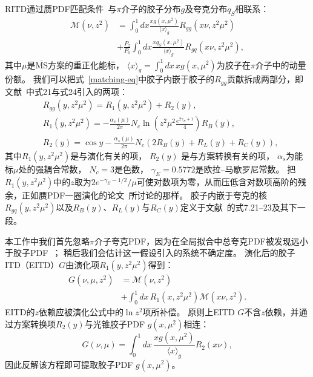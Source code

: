 RITD通过赝PDF匹配条件~\cite{Balitsky:2019krf}与$\pi$介子的胶子分布$g$及夸克分布$q_S$相联系：
%
\begin{align}
\mathscr{M}(\nu,z^2)&=\int_0^1 dx \frac{xg(x,\mu^2)}{\langle x \rangle_g}R_{gg}(x\nu,z^2\mu^2) \nonumber \\
&+\frac{P_z}{P_0}\int_0^1 dx \frac{xq_S(x,\mu^2)}{\langle x \rangle_g}R_{gq}(x\nu,z^2\mu^2),
\label{matching-eq}
\end{align}
%
其中$\mu$是$\overline{\text{MS}}$方案的重正化能标，
$\langle x \rangle_g=\int_0^1 dx \, x g(x,\mu^2)$为胶子在$\pi$介子中的动量份额。
我们可以把式~\ref{matching-eq}中胶子内嵌于胶子的$R_{gg}$贡献拆成两部分，即文献~\cite{Radyushkin:2018cvn}中式21与式24引入的两项：
%
\begin{align}
&R_{gg}(y,z^2\mu^2)=R_1(y,z^2\mu^2)+R_2(y), \label{matching-kernel}\\
&R_1(y,z^2\mu^2)=-\frac{\alpha_s(\mu)}{2\pi}N_c\ln\left(z^2\mu^2\frac{e^{2\gamma_E+1}}{4}\right)R_B(y), \label{matching-evolve}\\
&R_2(y)=\cos y-\frac{\alpha_s(\mu)}{2\pi}N_c\left( 2R_B(y)+R_L(y)+R_C(y)\right),
\label{matching-scheme}
\end{align}
%
其中$R_1(y,z^2\mu^2)$是与演化有关的项，
$R_2(y)$
是与方案转换有关的项，
$\alpha_s$为能标$\mu$处的强耦合常数，
$N_c=3$是色数，
$\gamma_E=0.5772$是欧拉--马歇罗尼常数。
%
把$R_1(y,z^2\mu^2)$中的$z$取为$2e^{-\gamma_E-1/2}/\mu$可使对数项为零，从而压低含对数项高阶的残余，正如赝PDF一圈演化的论文~\cite{Radyushkin:2018cvn}所讨论的那样。
%
胶子内嵌于夸克的核$R_{gq}(y,z^2\mu^2)$以及$R_B(y)$、$R_L(y)$与$R_C(y)$定义于文献~\cite{Balitsky:2019krf}的式7.21--23及其下一段。

本工作中我们首先忽略$\pi$介子夸克PDF，因为在全局拟合中总夸克PDF被发现远小于胶子PDF~\cite{Barry:2018ort,Novikov:2020snp}；
稍后我们会估计这一假设引入的系统不确定度。
演化后的胶子ITD（EITD）$G$由演化项$R_1(y,z^2\mu^2)$得到：
%
\begin{align}
G(\nu,\mu,z^2)&=\mathscr{M}(\nu,z^2)\nonumber\\
&+\int^1_0 dx\, R_1(x,z^2\mu^2)\mathscr{M}(x\nu,z^2).
\label{evolution}
\end{align}
%
EITD的$z$依赖应被演化公式中的$\ln{z^2}$项所补偿。
原则上EITD $G$不含$z$依赖，并通过方案转换项$R_2(y)$与光锥胶子PDF $g(x,\mu^2)$相连：
%
\begin{equation}
G(\nu,\mu)=\int_0^1 dx\, \frac{xg(x,\mu^2)}{\langle x \rangle_g} R_2(x\nu),
\label{conversion}
\end{equation}
%
因此反解该方程即可提取胶子PDF $g(x,\mu^2)$。


